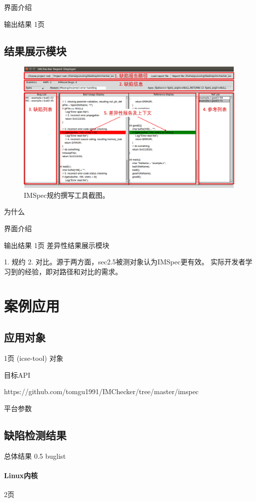 界面介绍

输出结果
1页
\subsection{结果展示模块}
\begin{figure}[b]
	\centering
	\includegraphics[width=0.85\linewidth]{figures/cp4-IMDisplayer.png}
	\caption{
		IMSpec规约撰写工具截图。
	}
	\label{fig:4-3-IMDisplayer}
\end{figure}
为什么

界面介绍

输出结果
1页
差异性结果展示模块

1. 规约 2. 对比。源于两方面，sec2.5被测对象认为IMSpec更有效。
实际开发者学习到的经验，即对路径和对比的需求。

\section{案例应用}
\label{sec:4.4}
\subsection{应用对象}
1页
(icse-tool)
对象

目标API

https://github.com/tomgu1991/IMChecker/tree/master/imspec

平台参数



\subsection{缺陷检测结果}

总体结果
0.5
buglist

\paragraph{Linux内核}
2页

